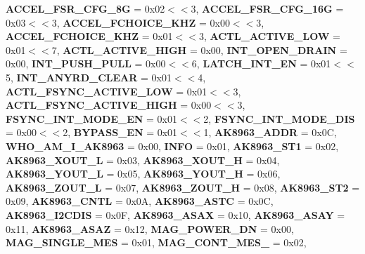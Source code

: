 \begin{DoxyCompactItemize}
\newline
{\bfseries A\+C\+C\+E\+L\+\_\+\+F\+S\+R\+\_\+\+C\+F\+G\+\_\+8G} = 0x02$<$$<$3, 
{\bfseries A\+C\+C\+E\+L\+\_\+\+F\+S\+R\+\_\+\+C\+F\+G\+\_\+16G} = 0x03$<$$<$3, 
{\bfseries A\+C\+C\+E\+L\+\_\+\+F\+C\+H\+O\+I\+C\+E\+\_\+K\+HZ} = 0x00$<$$<$3, 
{\bfseries A\+C\+C\+E\+L\+\_\+\+F\+C\+H\+O\+I\+C\+E\+\_\+K\+HZ} = 0x01$<$$<$3, 
\newline
{\bfseries A\+C\+T\+L\+\_\+\+A\+C\+T\+I\+V\+E\+\_\+\+L\+OW} = 0x01$<$$<$7, 
{\bfseries A\+C\+T\+L\+\_\+\+A\+C\+T\+I\+V\+E\+\_\+\+H\+I\+GH} = 0x00, 
{\bfseries I\+N\+T\+\_\+\+O\+P\+E\+N\+\_\+\+D\+R\+A\+IN} = 0x00, 
{\bfseries I\+N\+T\+\_\+\+P\+U\+S\+H\+\_\+\+P\+U\+LL} = 0x00$<$$<$6, 
\newline
{\bfseries L\+A\+T\+C\+H\+\_\+\+I\+N\+T\+\_\+\+EN} = 0x01$<$$<$5, 
{\bfseries I\+N\+T\+\_\+\+A\+N\+Y\+R\+D\+\_\+\+C\+L\+E\+AR} = 0x01$<$$<$4, 
{\bfseries A\+C\+T\+L\+\_\+\+F\+S\+Y\+N\+C\+\_\+\+A\+C\+T\+I\+V\+E\+\_\+\+L\+OW} = 0x01$<$$<$3, 
{\bfseries A\+C\+T\+L\+\_\+\+F\+S\+Y\+N\+C\+\_\+\+A\+C\+T\+I\+V\+E\+\_\+\+H\+I\+GH} = 0x00$<$$<$3, 
\newline
{\bfseries F\+S\+Y\+N\+C\+\_\+\+I\+N\+T\+\_\+\+M\+O\+D\+E\+\_\+\+EN} = 0x01$<$$<$2, 
{\bfseries F\+S\+Y\+N\+C\+\_\+\+I\+N\+T\+\_\+\+M\+O\+D\+E\+\_\+\+D\+IS} = 0x00$<$$<$2, 
{\bfseries B\+Y\+P\+A\+S\+S\+\_\+\+EN} = 0x01$<$$<$1, 
{\bfseries A\+K8963\+\_\+\+A\+D\+DR} = 0x0C, 
\newline
{\bfseries W\+H\+O\+\_\+\+A\+M\+\_\+\+I\+\_\+\+A\+K8963} = 0x00, 
{\bfseries I\+N\+FO} = 0x01, 
{\bfseries A\+K8963\+\_\+\+S\+T1} = 0x02, 
{\bfseries A\+K8963\+\_\+\+X\+O\+U\+T\+\_\+L} = 0x03, 
\newline
{\bfseries A\+K8963\+\_\+\+X\+O\+U\+T\+\_\+H} = 0x04, 
{\bfseries A\+K8963\+\_\+\+Y\+O\+U\+T\+\_\+L} = 0x05, 
{\bfseries A\+K8963\+\_\+\+Y\+O\+U\+T\+\_\+H} = 0x06, 
{\bfseries A\+K8963\+\_\+\+Z\+O\+U\+T\+\_\+L} = 0x07, 
\newline
{\bfseries A\+K8963\+\_\+\+Z\+O\+U\+T\+\_\+H} = 0x08, 
{\bfseries A\+K8963\+\_\+\+S\+T2} = 0x09, 
{\bfseries A\+K8963\+\_\+\+C\+N\+TL} = 0x0A, 
{\bfseries A\+K8963\+\_\+\+A\+S\+TC} = 0x0C, 
\newline
{\bfseries A\+K8963\+\_\+\+I2\+C\+D\+IS} = 0x0F, 
{\bfseries A\+K8963\+\_\+\+A\+S\+AX} = 0x10, 
{\bfseries A\+K8963\+\_\+\+A\+S\+AY} = 0x11, 
{\bfseries A\+K8963\+\_\+\+A\+S\+AZ} = 0x12, 
\newline
{\bfseries M\+A\+G\+\_\+\+P\+O\+W\+E\+R\+\_\+\+DN} = 0x00, 
{\bfseries M\+A\+G\+\_\+\+S\+I\+N\+G\+L\+E\+\_\+\+M\+ES} = 0x01, 
{\bfseries M\+A\+G\+\_\+\+C\+O\+N\+T\+\_\+\+M\+E\+S\+\_} = 0x02, 
$$
\end{DoxyCompactItemize}
